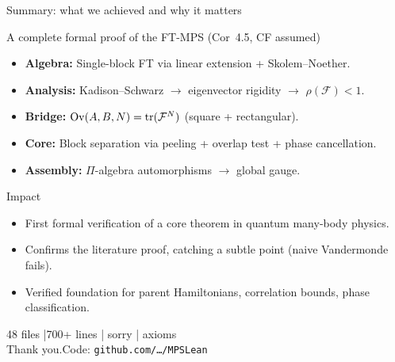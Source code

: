 \documentclass[aspectratio=169,10pt]{beamer}
\newcommand{\cF}{\mathcal{F}}
\newcommand{\Ov}{\mathrm{Ov}}
\begin{document}
\begin{frame}{Summary: what we achieved and why it matters}
    \vspace{-0.6em}

    \begin{block}{A complete formal proof of the FT-MPS (Cor~4.5, CF assumed)}
        \begin{itemize}\itemsep0.2em
            \item \textbf{Algebra:} Single-block FT via linear extension + Skolem--Noether.
            \item \textbf{Analysis:} Kadison--Schwarz $\to$ eigenvector rigidity $\to$ $\rho(\cF)<1$.
            \item \textbf{Bridge:} $\Ov(A,B,N) = \tr(\cF^N)$ (square + rectangular).
            \item \textbf{Core:} Block separation via peeling + overlap test + phase cancellation.
            \item \textbf{Assembly:} $\Pi$-algebra automorphisms $\to$ global gauge.
        \end{itemize}
    \end{block}

    \begin{block}{Impact}
        \begin{itemize}\itemsep0.15em
            \item \alert{First formal verification} of a core theorem in quantum many-body physics.
            \item Confirms the literature proof, catching a subtle point (naive Vandermonde fails).
            \item Verified foundation for parent Hamiltonians, correlation bounds, phase classification.
        \end{itemize}
    \end{block}

    \vspace{0.3em}
    \begin{center}
        \textcolor{leangreen}{\footnotesize 48 files \quad|700+ lines \quad| sorry \quad| axioms}
        \\[0.2em]
        \textcolor{dimwhite}{\footnotesize Thank you.\quad Code: \texttt{github.com/\ldots/MPSLean}}
    \end{center}
\end{frame}

\appendix
\end{document}
